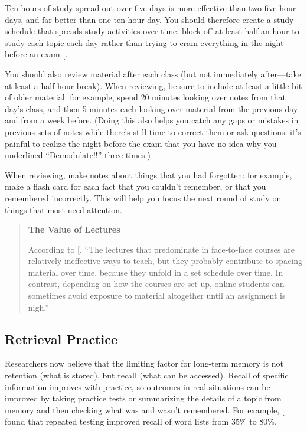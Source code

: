 Ten hours of study spread out over five days is more effective than two
five-hour days, and far better than one ten-hour day. You should
therefore create a study schedule that spreads study activities over
time: block off at least half an hour to study each topic each day
rather than trying to cram everything in the night before an exam
{[}\protect[\hyperlink{b:Kang2016}{Kang2016}]{]}.

You should also review material after each class (but not immediately
after---take at least a half-hour break). When reviewing, be sure to
include at least a little bit of older material: for example, spend 20
minutes looking over notes from that day's class, and then 5 minutes
each looking over material from the previous day and from a week before.
(Doing this also helps you catch any gaps or mistakes in previous sets
of notes while there's still time to correct them or ask questions: it's
painful to realize the night before the exam that you have no idea why
you underlined ``Demodulate!!'' three times.)

When reviewing, make notes about things that you had forgotten: for
example, make a flash card for each fact that you couldn't remember, or
that you remembered incorrectly. This will help you focus the next round
of study on things that most need attention.

\begin{quote}\setlength{\parindent}{0pt}
\textbf{The Value of Lectures}

According to {[}\protect[\hyperlink{b:Mill2016a}{Mill2016a}]{]}, ``The lectures that predominate in
face-to-face courses are relatively ineffective ways to teach, but
they probably contribute to spacing material over time, because they
unfold in a set schedule over time. In contrast, depending on how the
courses are set up, online students can sometimes avoid exposure to
material altogether until an assignment is nigh.''
\end{quote}

\subsection{Retrieval Practice}\label{retrieval-practice}

Researchers now believe that the limiting factor for long-term memory is
not retention (what is stored), but recall (what can be accessed).
Recall of specific information improves with practice, so outcomes in
real situations can be improved by taking practice tests or summarizing
the details of a topic from memory and then checking what was and wasn't
remembered. For example, {[}\protect[\hyperlink{b:Karp2008}{Karp2008}]{]} found that repeated testing
improved recall of word lists from 35\% to 80\%.

